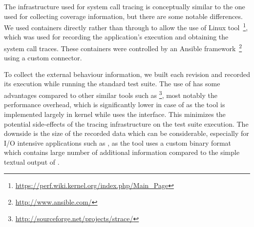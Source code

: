 
The infrastructure used for system call tracing is conceptually similar to the
one used for collecting coverage information, but there are some notable
differences. We used \lxc containers directly rather than through \docker to
allow the use of Linux 
tool~\footnote{\url{https://perf.wiki.kernel.org/index.php/Main_Page}}, which
was used for recording the application's execution and obtaining the system
call traces. These containers were controlled by an Ansible
framework~\footnote{\url{http://www.ansible.com/}} using a custom \lxc
connector.

To collect the external behaviour information, we built each revision and
recorded its execution while running the standard test suite. The use of
 has some advantages compared to other similar tools such as
\footnote{\url{http://sourceforge.net/projects/strace/}}, most
notably the performance overhead, which is significantly lower in case of
 as the tool is implemented largely in kernel while
 uses the \ptrace interface. This minimizes the potential
side-effects of the tracing infrastructure on the test suite execution.  The
downside is the size of the recorded data which can be considerable, especially
for I/O intensive applications such as \redis, as the  tool uses
a custom binary format which contains large number of additional information
compared to the simple textual output of .



